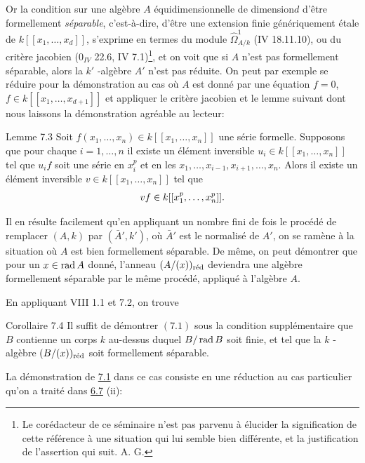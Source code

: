 \documentclass[10pt]{../fichiers-configuration-latex/smfart}
\begin{document}
Or la condition sur une algèbre $A$ équidimensionnelle de
dimension\pageoriginale $d$ d'être formellement \emph{séparable},
c'est-à-dire, d'être une extension finie génériquement étale de
$k[[x_{1},\ldots, x_{d}]]$, s'exprime en termes du module
$\widehat{\Omega}^{1}_{A/k}$ (\EGA IV 18.11.10), ou du critère
jacobien (\EGA $0_{IV}$ 22.6, IV 7.1)\footnote[1]{Le corédacteur de ce
séminaire n'est pas parvenu à élucider la signification de cette
référence à une situation qui lui semble bien différente, et la
justification de l'assertion qui suit. A. G.}, et on voit que si $A$
n'est pas formellement séparable, alors la $k'$ -algèbre $A'$ n'est
pas réduite. On peut par exemple se réduire pour la démonstration au
cas où $A$ est donné par une équation $f=0$, $f\in k[[x_{1},\ldots,
x_{d+1}]]$ et appliquer le critère jacobien et le lemme suivant dont
nous laissons la démonstration agréable au lecteur:

\begin{enonce*}{Lemme 7.3}
Soit $f(x_{1},\ldots,x_{n})\in k[[x_{1},\ldots,x_{n}]]$ une série
formelle. Supposons que pour chaque $i=1,\ldots,n$ il existe un
élément inversible $u_{i}\in k[[x_{1},\ldots,x_{n}]]$ tel que $u_{i}f$
soit une série en $x_{i}^{p}$ et en les
$x_{1},\ldots,x_{i-1},x_{i+1},\ldots,x_{n}$. Alors il existe un
élément inversible $v\in k[[x_{1},\ldots,x_{n}]]$ tel que
$$
vf\in k[[x_{1}^{p},\dots,x_{n}^{p}]]{}.
$$
\end{enonce*}

Il en résulte facilement qu'en appliquant un nombre fini de fois le
procédé de remplacer $(A,k)$ par $(\bar{A}',k')$, où $\bar{A}'$ est le
normalisé de $A'$, on se ramène à la situation où $A$ est bien
formellement séparable. De même, on peut démontrer que pour un $x\in
\operatorname{rad} A$ donné, l'anneau $(A/(x))_{\text{\rm réd}}$ deviendra une
algèbre formellement séparable par le même procédé, appliqué à
l'algèbre $A$.

En appliquant VIII 1.1 et 7.2, on trouve

\begin{enonce*}{Corollaire 7.4}
Il suffit de démontrer $(7.1)$ sous la condition supplémentaire que
$B$ contienne un corps $k$ au-dessus duquel $B/\operatorname{rad} B$ soit finie, et
tel que la $k$ -algèbre $(B/(x))_{\text{\rm réd}}$ soit formellement
séparable.\pageoriginale
\end{enonce*}
 
La démonstration de \hyperref[XIX.lem7.1]{7.1} dans ce cas consiste en une
réduction au cas 
particulier qu'on a traité dans \hyperref[XIX.lem6.7]{6.7}  (ii):
\end{document}
